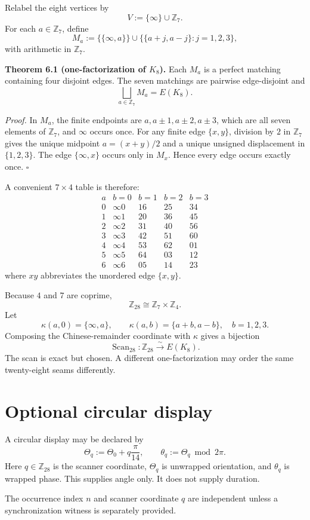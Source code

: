 \documentclass[11pt]{article}
\theoremstyle{definition}
\newcommand{\Z}{\mathbb Z}
\begin{document}
Relabel the eight vertices by
\[
V:=\{\infty\}\cup\Z_7.
\]
For each $a\in\Z_7$, define
\[
M_a:=\{\{\infty,a\}\}
\cup
\{\{a+j,a-j\}:j=1,2,3\},
\]
with arithmetic in $\Z_7$.

\textbf{Theorem 6.1 (one-factorization of $K_8$).} Each $M_a$ is a perfect matching containing four disjoint edges. The seven matchings are pairwise edge-disjoint and
\[
\boxed{\bigsqcup_{a\in\Z_7}M_a=E(K_8).}
\]

\textit{Proof.} In $M_a$, the finite endpoints are
$a,a\pm1,a\pm2,a\pm3$, which are all seven elements of $\Z_7$, and $\infty$ occurs once. For any finite edge $\{x,y\}$, division by $2$ in $\Z_7$ gives the unique midpoint
$a=(x+y)/2$ and a unique unsigned displacement in $\{1,2,3\}$. The edge $\{\infty,x\}$ occurs only in $M_x$. Hence every edge occurs exactly once. \hfill$\square$

A convenient $7\times4$ table is therefore:
\[
\begin{array}{c|cccc}
a&b=0&b=1&b=2&b=3\\\hline
0&\infty0&16&25&34\\
1&\infty1&20&36&45\\
2&\infty2&31&40&56\\
3&\infty3&42&51&60\\
4&\infty4&53&62&01\\
5&\infty5&64&03&12\\
6&\infty6&05&14&23
\end{array}
\]
where $xy$ abbreviates the unordered edge $\{x,y\}$.

Because $4$ and $7$ are coprime,
\[
\Z_{28}\cong\Z_7\times\Z_4.
\]
Let
\[
\kappa(a,0)=\{\infty,a\},
\qquad
\kappa(a,b)=\{a+b,a-b\},\quad b=1,2,3.
\]
Composing the Chinese-remainder coordinate with $\kappa$ gives a bijection
\[
\boxed{\operatorname{Scan}_{28}:\Z_{28}\xrightarrow{\sim}E(K_8).}
\]
The scan is exact but chosen. A different one-factorization may order the same twenty-eight seams differently.

\section{Optional circular display}
A circular display may be declared by
\[
\Theta_q:=\Theta_0+q\frac{\pi}{14},
\qquad
\theta_q:=\Theta_q\bmod2\pi.
\]
Here $q\in\Z_{28}$ is the scanner coordinate, $\Theta_q$ is unwrapped orientation, and $\theta_q$ is wrapped phase. This supplies angle only. It does not supply duration.

The occurrence index $n$ and scanner coordinate $q$ are independent unless a synchronization witness is separately provided.
\end{document}

